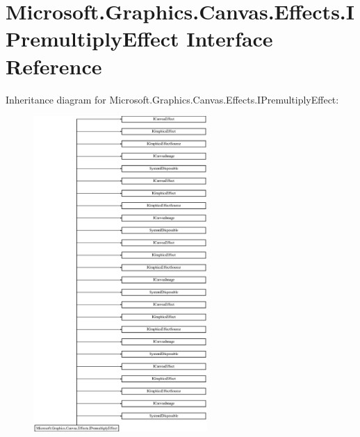 \hypertarget{interface_microsoft_1_1_graphics_1_1_canvas_1_1_effects_1_1_i_premultiply_effect}{}\section{Microsoft.\+Graphics.\+Canvas.\+Effects.\+I\+Premultiply\+Effect Interface Reference}
\label{interface_microsoft_1_1_graphics_1_1_canvas_1_1_effects_1_1_i_premultiply_effect}
Inheritance diagram for Microsoft.\+Graphics.\+Canvas.\+Effects.\+I\+Premultiply\+Effect\+:\begin{figure}[H]
\begin{center}
\leavevmode
\includegraphics[height=12.000000cm]{interface_microsoft_1_1_graphics_1_1_canvas_1_1_effects_1_1_i_premultiply_effect}
\end{center}
\end{figure}
